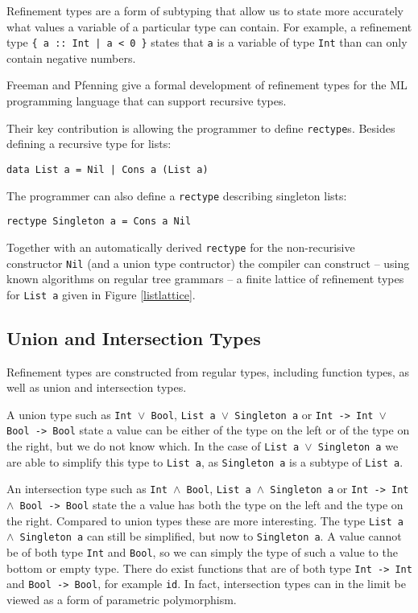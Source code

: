 \documentclass[a4paper]{report}
\begin{document}
Refinement types are a form of subtyping that allow us to state more accurately what values a variable of a particular type can contain. For example, a refinement type {\tt \{ a :: Int | a < 0 \}} states that {\tt a} is a variable of type {\tt Int} than can only contain negative numbers.

Freeman and Pfenning \cite{Freeman:1991:RTM:113445.113468,Freeman94refinementtypes} give a formal development of refinement types for the ML programming language that can support recursive types.

Their key contribution is allowing the programmer to define {\tt rectype}s. Besides defining a recursive type for lists:

\begin{verbatim}
data List a = Nil | Cons a (List a)
\end{verbatim}

The programmer can also define a {\tt rectype} describing singleton lists:

\begin{verbatim}
rectype Singleton a = Cons a Nil
\end{verbatim}

Together with an automatically derived {\tt rectype} for the non-recurisive constructor {\tt Nil} (and a union type contructor) the compiler can construct -- using known algorithms on regular tree grammars \cite{DBLP:books/others/tree1984} -- a finite lattice of refinement types for {\tt List a} given in Figure \ref{listlattice}.

\subsection{Union and Intersection Types}

Refinement types are constructed from regular types, including function types, as well as union and intersection types.

A union type such as {\tt Int $\lor$ Bool}, {\tt List a $\lor$ Singleton a} or {\tt Int -> Int $\lor$ Bool -> Bool} state a value can be either of the type on the left or of the type on the right, but we do not know which. In the case of {\tt List a $\lor$ Singleton a} we are able to simplify this type to {\tt List a}, as {\tt Singleton a} is a subtype of {\tt List a}.

An intersection type such as {\tt Int $\land$ Bool}, {\tt List a $\land$ Singleton a} or {\tt Int -> Int $\land$ Bool -> Bool} state the a value has both the type on the left and the type on the right. Compared to union types these are more interesting. The type {\tt List a $\land$ Singleton a} can still be simplified, but now to {\tt Singleton a}. A value cannot be of both type {\tt Int} and {\tt Bool}, so we can simply the type of such a value to the bottom or empty type. There do exist functions that are of both type {\tt Int -> Int} and {\tt Bool -> Bool}, for example {\tt id}. In fact, intersection types can in the limit be viewed as a form of parametric polymorphism.
\end{document}
